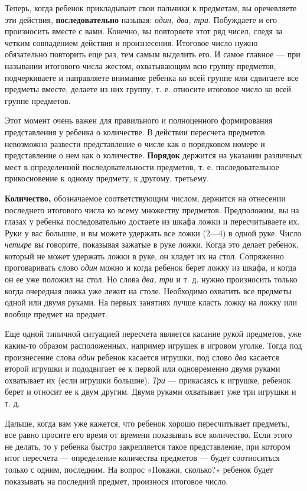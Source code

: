 \documentclass[a5paper]{book}
\renewcommand{\emph}[1]{\textit{#1}}
\begin{document}
Теперь, когда ребенок прикладывает свои пальчики к предметам, вы
оречевляете эти действия, \textbf{последовательно} называя: \emph{один,
два, три.} Побуждаете и его произносить вместе с вами. Конечно, вы
повторяете этот ряд чисел, следя за четким совпадением действия и
произнесения. Итоговое число нужно обязательно повторить еще раз, тем
самым выделить его. И самое главное --- при назывании итогового числа
жестом, охватывающим всю группу предметов, подчеркиваете и направляете
внимание ребенка ко всей группе или сдвигаете все предметы вместе,
делаете из них группу, т. е. относите итоговое число ко всей группе
предметов.

Этот момент очень важен для правильного и полноценного формирования
представления у ребенка о количестве. В действии пересчета предметов
невозможно развести представление о числе как о порядковом номере и
представление о нем как о количестве. \textbf{Порядок} держится на
указании различных мест в определенной последовательности предметов, т.
е. последовательное прикосновение к одному предмету, к другому,
третьему.

\textbf{Количество,} обозначаемое соответствующим числом, держится на
отнесении последнего итогового числа ко всему множеству предметов.
Предположим, вы на глазах у ребенка последовательно достаете из шкафа
ложки и пересчитываете их. Руки у вас большие, и вы можете удержать все
ложки (2---4) в одной руке. Число \emph{четыре} вы говорите, показывая
зажатые в руке ложки. Когда это делает ребенок, который не может
удержать ложки в руке, он кладет их на стол. Сопряженно проговаривать
слово \emph{один} можно и когда ребенок берет ложку из шкафа, и когда он
ее уже положил на стол. Но слова \emph{два, три} и т. д. нужно
произносить только когда очередная ложка уже лежит на столе. Необходимо
охватить все предметы одной или двумя руками. На первых занятиях лучше
класть ложку на ложку или вообще предмет на предмет.

Еще одной типичной ситуацией пересчета является касание рукой предметов,
уже каким-то образом расположенных, например игрушек в игровом уголке.
Тогда под произнесение слова \emph{один} ребенок касается игрушки, под
слово \emph{два} касается второй игрушки и пододвигает ее к первой или
одновременно двумя руками охватывает их (если игрушки большие).
\emph{Три} --- прикасаясь к игрушке, ребенок берет и относит ее к двум
другим. Двумя руками охватывает уже три игрушки и т. д.

Дальше, когда вам уже кажется, что ребенок хорошо пересчитывает
предметы, все равно просите его время от времени показывать все
количество. Если этого не делать, то у ребенка быстро закрепляется такое
представление, при котором итог пересчета --- определение количества
предметов --- будет соотноситься только с одним, последним. На вопрос
«Покажи, сколько?» ребенок будет показывать на последний предмет,
произнося итоговое число.
\end{document}
